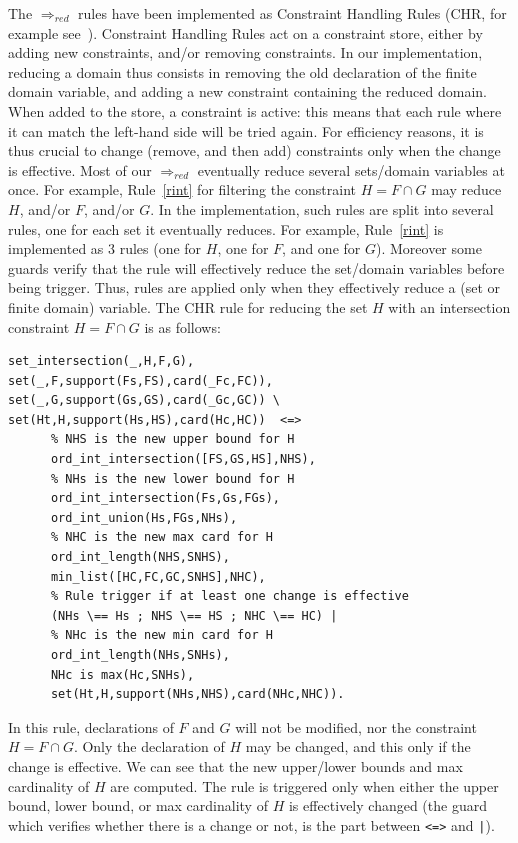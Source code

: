 \documentclass[3p,authoryear,times]{elsarticle}
\newcommand{\rmin}[0]{{\Rightarrow_{red}}}
\begin{document}
 The $\rmin$ rules have been implemented as Constraint Handling Rules (CHR, for example see~\cite{chr}). Constraint Handling Rules
act on a constraint store, either by adding new constraints, and/or removing constraints. In our implementation, reducing a domain thus consists in removing the old declaration of the finite domain variable, and adding a new constraint containing the reduced domain. When added to the store, a constraint is active: this means that each rule where it can match the left-hand side will be tried again. For efficiency reasons, it is thus crucial to change (remove, and then add) constraints only when the change is effective. Most of our $\rmin$ eventually reduce several sets/domain variables at once. For example, Rule~\ref{rint} for filtering the constraint $H=F \cap G$ may reduce $H$, and/or $F$, and/or $G$. In the implementation, such rules are split into several rules, one for each set it eventually reduces. For example, Rule~\ref{rint} is implemented as 3 rules (one for $H$, one for $F$, and one for $G$). Moreover some guards verify that the rule will effectively reduce the set/domain variables before being trigger. Thus, rules are applied only when they effectively reduce a (set or finite domain) variable.
The CHR rule for reducing the set $H$ with an intersection constraint  $H=F \cap G$ is as follows:
\begin{verbatim}
set_intersection(_,H,F,G), 
set(_,F,support(Fs,FS),card(_Fc,FC)), 
set(_,G,support(Gs,GS),card(_Gc,GC)) \
set(Ht,H,support(Hs,HS),card(Hc,HC))  <=>
      % NHS is the new upper bound for H
      ord_int_intersection([FS,GS,HS],NHS),
      % NHs is the new lower bound for H
      ord_int_intersection(Fs,Gs,FGs),
      ord_int_union(Hs,FGs,NHs),
      % NHC is the new max card for H
      ord_int_length(NHS,SNHS),
      min_list([HC,FC,GC,SNHS],NHC),
      % Rule trigger if at least one change is effective
      (NHs \== Hs ; NHS \== HS ; NHC \== HC) |
      % NHc is the new min card for H
      ord_int_length(NHs,SNHs),
      NHc is max(Hc,SNHs),
      set(Ht,H,support(NHs,NHS),card(NHc,NHC)).
\end{verbatim}
In this rule, declarations of $F$ and $G$ will not be modified, nor the constraint $H=F \cap G$. Only the declaration of $H$ may be changed, and this only if the change is effective. We can see that the new upper/lower bounds and max cardinality of $H$ are computed. The rule is triggered only when either the upper bound, lower bound, or max cardinality of $H$ is effectively changed (the guard which verifies whether there is a change or not, is the part between \texttt{<=>} and \texttt{|}).
\end{document}
